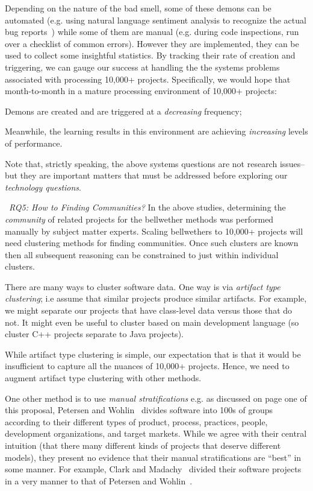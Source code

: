 Depending on the nature of the bad smell, some of these demons can be automated (e.g. using natural language sentiment analysis to recognize
the actual bug reports~\cite{someReference}) while some of them are manual
(e.g. during code inspections, run over a checklist of common errors). 
However they are implemented, they can be used
to collect some insightful  statistics.
By tracking their rate
of creation and triggering, we can gauge our success at handling the the systems problems associated with processing 10,000+ projects. Specifically, we would hope that month-to-month in a  mature
processing environment of 10,000+ projects:
\bi
\item
 Demons are created and are triggered at a {\em decreasing} frequency;
 \item
 Meanwhile, the learning results in this environment are achieving {\em increasing}
 levels of performance.
 \ei

 

 

Note that, strictly  speaking, the above   systems questions  are not research issues-- but they are important matters   that must be addressed before exploring
our {\em technology questions}.


~{\em RQ5: How to Finding Communities?} In the above studies, determining the {\em community} of related projects for the bellwether methods was performed manually by   subject matter experts. Scaling bellwethers to 10,000+ projects will need  clustering methods for finding  communities. Once such clusters are known then all subsequent reasoning can be constrained to just within individual clusters.

There are many ways to cluster software data.
One way is via {\em artifact type clustering}; i.e assume that similar projects produce similar artifacts. For example, we might separate our projects that have class-level data  versus those that do not.
It might even be useful to cluster based on main development language (so cluster C++ projects separate to Java projects).

While artifact type clustering is simple, our expectation that is that it would be insufficient to capture all the nuances of 10,000+ projects.
Hence, we need to augment artifact type clustering with other methods. 

One other method  is to use 
{\em manual stratifications} e.g. as discussed on page one of this proposal,
Petersen and Wohlin~\cite{petersen} divides software into 100s of groups according to their different types of product, process, practices, people, development organizations, and target markets. While we agree
with their central intuition (that there many different kinds of projects that deserve different models), they present no evidence that their manual stratifications are ``best'' in some manner.
For example, 
Clark and Madachy~\cite{clark15} divided their software projects in a very manner to
that of  Petersen and Wohlin~\cite{petersen}.

